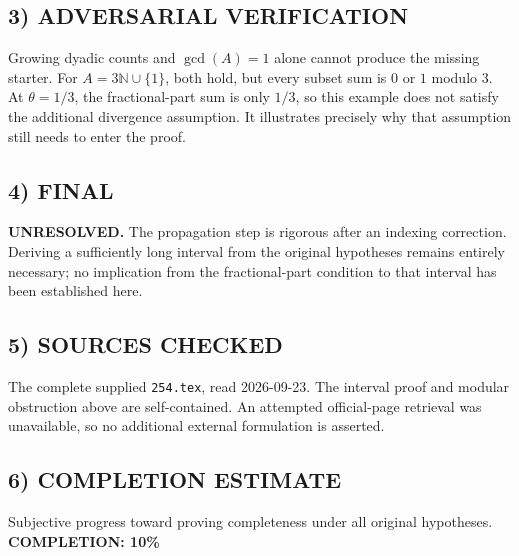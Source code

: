 \subsection*{3) ADVERSARIAL VERIFICATION}
Growing dyadic counts and $\gcd(A)=1$ alone cannot produce the missing starter. For $A=3\mathbb N\cup\{1\}$, both hold, but every subset sum is $0$ or $1$ modulo $3$. At $\theta=1/3$, the fractional-part sum is only $1/3$, so this example does not satisfy the additional divergence assumption. It illustrates precisely why that assumption still needs to enter the proof.
\subsection*{4) FINAL}
\textbf{UNRESOLVED.} The propagation step is rigorous after an indexing correction. Deriving a sufficiently long interval from the original hypotheses remains entirely necessary; no implication from the fractional-part condition to that interval has been established here.
\subsection*{5) SOURCES CHECKED}
The complete supplied \texttt{254.tex}, read 2026-09-23. The interval proof and modular obstruction above are self-contained. An attempted official-page retrieval was unavailable, so no additional external formulation is asserted.
\subsection*{6) COMPLETION ESTIMATE}
Subjective progress toward proving completeness under all original hypotheses.
\textbf{COMPLETION: 10\%}
